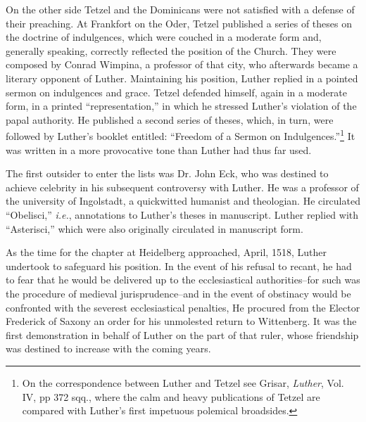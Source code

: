 On the other side Tetzel and the Dominicans were not satisfied
with a defense of their preaching. At Frankfort on the Oder, Tetzel
published a series of theses on the doctrine of indulgences, which
were couched in a moderate form and, generally speaking, correctly
reflected the position of the Church. They were composed by Conrad
Wimpina, a professor of that city, who afterwards became a literary
opponent of Luther. Maintaining his position, Luther replied in a
pointed sermon on indulgences and grace. Tetzel defended himself,
again in a moderate form, in a printed “representation,” in which
he stressed Luther’s violation of the papal authority. He published a
second series of theses, which, in turn, were followed by Luther’s
booklet entitled: “Freedom of a Sermon on Indulgences.”\footnote
{On the correspondence between Luther and Tetzel see Grisar, \textit{Luther}, Vol. IV, pp
372 sqq., where the calm and heavy publications of Tetzel are compared with Luther’s
first impetuous polemical broadsides.}
It was written in a more provocative tone than Luther had thus far used.

The first outsider to enter the lists was Dr. John Eck, who was
destined to achieve celebrity in his subsequent controversy with
Luther. He was a professor of the university of Ingolstadt, a quickwitted
humanist and theologian. He circulated “Obelisci,” \textit{i.e.}, annotations
to Luther’s theses in manuscript. Luther replied with
“Asterisci,” which were also originally circulated in manuscript
form.

As the time for the chapter at Heidelberg approached, April, 1518,
Luther undertook to safeguard his position. In the event of his refusal
to recant, he had to fear that he would be delivered up to the
ecclesiastical authorities--for such was the procedure of medieval
jurisprudence--and in the event of obstinacy would be confronted
with the severest ecclesiastical penalties, He procured from the
Elector Frederick of Saxony an order for his unmolested return to
Wittenberg. It was the first demonstration in behalf of Luther on the
part of that ruler, whose friendship was destined to increase with the
coming years.

